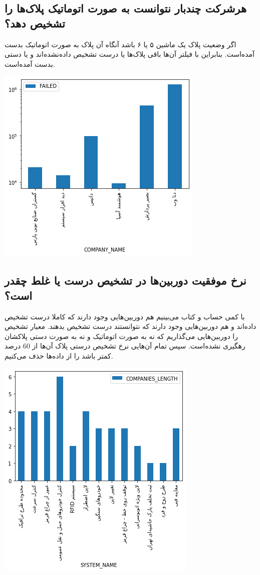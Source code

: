 \documentclass[12pt]{article}
\begin{document}
\subsection*{هر‌شرکت چند‌بار نتوانست به صورت اتوماتیک پلاک‌ها را تشخیص دهد؟}
اگر وضعیت پلاک یک ماشین ۵ یا ۶ باشد آنگاه آن پلاک به صورت اتوماتیک بدست آمده‌است. بنابراین با فیلتر آن‌ها باقی پلاک‌ها یا درست تشخیص داده‌نشده‌اند و یا دستی بدست آمده‌است.

\includegraphics[scale=1]{faieldCompanies.png}

\subsection*{نرخ موفقیت دوربین‌ها در تشخیص درست یا غلط چقدر است؟}
با کمی حساب و کتاب می‌بینیم هم دوربین‌هایی وجود دارند که کاملا درست تشخیص داده‌اند و هم  دوربین‌هایی وجود دارند که نتوانستند درست تشخیص بدهند.
معیار تشخیص را دوربین‌هایی می‌گذاریم که نه به صورت اتوماتیک و نه به صورت دستی 
پلاکشان رهگیری نشده‌است. سپس تمام آن‌هایی نرخ تشخیص درستی پلاک آن‌ها از 
60 درصد کمتر باشد را از داده‌ها حذف می‌کنیم.

\includegraphics[scale=1]{systemLength.png}
\end{document}

